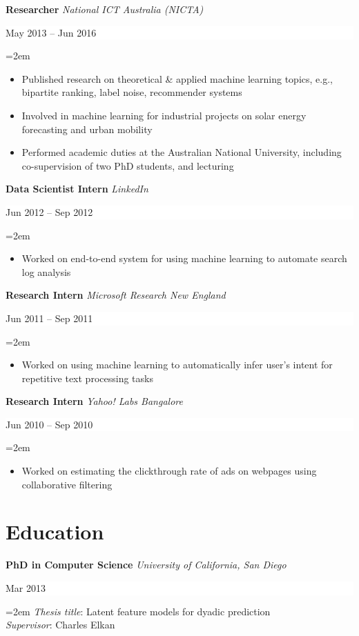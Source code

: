 \documentclass[fontsize=11pt]{article}
\newcommand{\NewPart}[1]{\section*{#1}}
\newcommand{\EducationEntry}[4]{
    \noindent \textbf{#1}
    \textit{#3}
    \hfill      %
    \colorbox{White}{
      \parbox{9em}{
      \hfill\color{Black}#2}} \par  %
    \noindent\hangindent=2em\hangafter=0 \small #4 %
    \normalsize \par}
\newcommand{\WorkEntry}[4]{       %
    \noindent
    \textbf{#1}
    \textit{#3} %
    \hfill      %
    \colorbox{White}{%
      \parbox{9em}{%
      \hfill\color{Black}#2}} \par   %
    \noindent\hangindent=2em\hangafter=0 \small #4 %
    \normalsize \par}
\begin{document}
\WorkEntry
{Researcher}
{May 2013 -- Jun 2016}
{National ICT Australia (NICTA)}
{
\begin{itemize} \itemsep -1pt
        \item
            Published research on theoretical \& applied machine learning topics, e.g., bipartite ranking, label noise, recommender systems

        \item
            Involved in machine learning for industrial projects on {solar energy forecasting} and urban mobility

        \item
            Performed academic duties at the Australian National University, including co-supervision of two PhD students, and lecturing
\end{itemize}
}

\WorkEntry
{Data Scientist Intern}
{Jun 2012 -- Sep 2012}
{LinkedIn}
{
\begin{itemize} \itemsep -1pt
        \item Worked on end-to-end system for using machine learning to automate search log analysis
\end{itemize}
}

\WorkEntry
{Research Intern}
{Jun 2011 -- Sep 2011}
{Microsoft Research New England}
{
\begin{itemize} \itemsep -1pt
        \item Worked on using machine learning to automatically infer user's intent for repetitive text processing tasks
\end{itemize}
}

\WorkEntry
{Research Intern}
{Jun 2010 -- Sep 2010}
{Yahoo! Labs Bangalore}
{
\begin{itemize} \itemsep -1pt
        \item Worked on estimating the clickthrough rate of ads on webpages using collaborative filtering
\end{itemize}
}


\NewPart{Education}{}

\EducationEntry
{PhD in Computer Science}
{Mar 2013}
{University of California, San Diego}
{
\hspace{-2pt}\emph{Thesis title}: Latent feature models for dyadic prediction \\
\emph{Supervisor}: Charles Elkan
}
\end{document}
